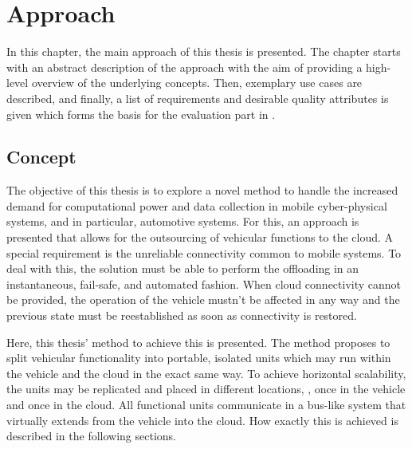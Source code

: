 
\chapter{Approach}\label{chapter:approach}

In this chapter, the main approach of this thesis is presented. The chapter starts with an abstract description of the approach with the aim of providing a high-level overview of the underlying concepts. Then, exemplary use cases are described, and finally, a list of requirements and desirable quality attributes is given which forms the basis for the evaluation part in .

%
%
%
%
%
%
%
%
%
%

\section{Concept} \label{sec:concept}
The objective of this thesis is to explore a novel method to handle the increased demand for computational power and data collection in mobile cyber-physical systems, and in particular, automotive systems. For this, an approach is presented that allows for the outsourcing of vehicular functions to the cloud.
A special requirement is the unreliable connectivity common to mobile systems. To deal with this, the solution must be able to perform the offloading in an instantaneous, fail-safe, and automated fashion. When cloud connectivity cannot be provided, the operation of the vehicle mustn't be affected in any way and the previous state must be reestablished as soon as connectivity is restored.

Here, this thesis' method to achieve this is presented. The method proposes to split vehicular functionality into portable, isolated units which may run within the vehicle and the cloud in the exact same way. To achieve horizontal scalability, the units may be replicated and placed in different locations, \eg , once in the vehicle and once in the cloud. All functional units communicate in a bus-like system that virtually extends from the vehicle into the cloud. How exactly this is achieved is described in the following sections.
\pagebreak
